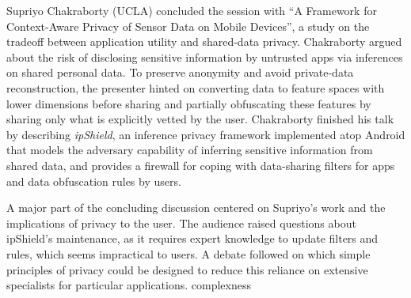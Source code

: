 Supriyo Chakraborty (UCLA) concluded the session with ``A
Framework for Context-Aware Privacy of Sensor Data on Mobile Devices'',
a study on the tradeoff between application utility and shared-data
privacy. Chakraborty argued about the risk of disclosing sensitive
information by untrusted apps via inferences on shared personal
data. To preserve anonymity and avoid private-data reconstruction, the
presenter hinted on converting data to feature spaces with lower
dimensions before sharing and partially obfuscating these features by
sharing only what is explicitly vetted by the user. Chakraborty finished
his talk by describing \emph{ipShield}, an inference privacy framework
implemented atop Android that models the adversary capability of
inferring sensitive information from shared data, and provides a
firewall for coping with data-sharing filters for apps and data
obfuscation rules by users.

A major part of the concluding discussion centered on Supriyo's work and
the implications of privacy to the user. The audience raised questions
about ipShield's maintenance, as it requires expert knowledge to update
filters and rules, which seems impractical to users. A debate followed
on which simple principles of privacy could be designed to reduce this
reliance on extensive specialists for particular applications.
complexness 
